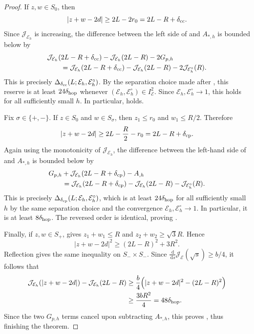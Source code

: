 \documentclass[11pt]{article}
\newcommand{\dd}{\,\mathrm d}
\newcommand{\cE}{\mathcal E}
\newcommand{\cJ}{\mathcal J}
\begin{document}
\begin{proof}
If $z,w\in S_0$, then
\[
|z+w-2d|\ge 2L-2r_0=2L-R+\delta_{\rm cc}.
\]  
Since $\cJ_{\cE_h}$ is increasing, the difference between the left side of  and $A_{*,h}$ is bounded below by
\begin{align*}
&\cJ_{\cE_h}(2L-R+\delta_{\rm cc})
-\cJ_{\cE_h}(2L-R)-2G_{p,h}\\
&\qquad=
\cJ_{\cE_h}(2L-R+\delta_{\rm cc})
-\cJ_{\cE_h}(2L-R)-2\cJ_{\cE_h^\circ}(R).
\end{align*}
This is precisely
$\Delta_{\delta_{\rm cc}}(L;\cE_h,\cE_h^\circ)$. By the separation choice
made after , this reserve is at least
$24\delta_{\rm hop}$ whenever
$(\cE_h,\cE_h^\circ)\in I_\cE^2$. Since
$\cE_h,\cE_h^\circ\to1$, this holds for all sufficiently small $h$. In particular,  holds.

Fix $\sigma\in\{+,-\}$. If $z\in S_0$ and $w\in S_\sigma$, then
$z_1\le r_0$ and $w_1\le R/2$.  Therefore
\[
 |z+w-2d|\ge 2L-\frac R2-r_0
 =2L-R+\delta_{\rm cp}.
\]
Again using the monotonicity of $\cJ_{\cE_h}$, the difference between the
left-hand side of  and $A_{*,h}$ is bounded below by
\begin{align*}
&G_{p,h}
+\cJ_{\cE_h}(2L-R+\delta_{\rm cp})
-A_{,h}\\
&\qquad=
\cJ_{\cE_h}(2L-R+\delta_{\rm cp})
-\cJ_{\cE_h}(2L-R)-\cJ_{\cE_h^\circ}(R).
\end{align*}
This is precisely
$\Delta_{\delta_{\rm cp}}(L;\cE_h,\cE_h^\circ)$, which is at least
$24\delta_{\rm hop}$ for all sufficiently small $h$ by the same separation
choice and the convergence $\cE_h,\cE_h^\circ\to1$. In particular, it is at
least $8\delta_{\rm hop}$.  The reversed order is identical, proving .

Finally, if $z,w\in S_+$,  gives
$z_1+w_1\le R$ and $z_2+w_2\ge\sqrt3R$.  Hence
\[
 |z+w-2d|^2\ge (2L-R)^2+3R^2.
\]
Reflection gives the same inequality on $S_-\times S_-$.  Since
$\frac{\dd}{\dd s}\cJ_\cE(\sqrt s)\ge b/4$, it follows that
\begin{align*}
\cJ_{\cE_h}(|z+w-2d|)-\cJ_{\cE_h}(2L-R)
&\ge
\frac b4\Bigl(|z+w-2d|^2-(2L-R)^2\Bigr)\\
&\ge\frac{3bR^2}{4}
=48\delta_{\rm hop}.
\end{align*}
Since the two $G_{p,h}$ terms cancel upon subtracting $A_{*,h}$,
this proves , thus finishing the theorem.


\end{proof}
\end{document}
